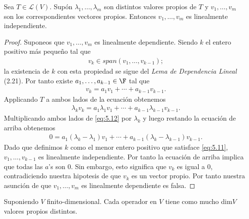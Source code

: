 \documentclass{scrartcl}
\begin{document}
\begin{theorem}
  \label{teo:indep}
  Sea $T \in \mathcal{L}(V)$. Supón $\lambda_1, \ldots ,\lambda_m$ son distintos valores propios de $T$ y $v_1, \ldots , v_m$ son los correspondientes vectores propios. Entonces $v_1, \ldots ,v_m$ es linealmente independiente. 
\end{theorem}

\begin{proof}
Suponeos que $v_1,\ldots ,v_m$ es linealmente dependiente. Siendo $k$ el entero positivo más pequeño tal que
  \begin{align}
  v_k \in span(v_1,\ldots ,v_{k-1}); \tag{5.11} \label{eq:5.11}
  \end{align}
  la existencia de $k$ con esta propiedad se sigue del \emph{Lema de Dependencia Lineal} (2.21). Por tanto existe $a_1,\ldots ,a_{k-1} \in \F$ tal que
  \begin{align}
    v_k = a_1 v_1 + \cdots + a_{k-1}v_{k-1}. \tag{5.12} \label{eq:5.12}
  \end{align}
  Applicando $T$ a ambos lados de la ecuación obtenemos
\begin{align*}
  \lambda_k v_k = a_1 \lambda_1 v_1 + \cdots + a_{k-1}\lambda_{k-1}v_{k-1}.
\end{align*}
Multiplicando ambos lados de \ref{eq:5.12} por $\lambda_k$ y luego restando la ecuación de arriba obtenemos
\begin{align*}
  0 = a_1 (\lambda_k - \lambda_1)v_1 + \cdots + a_{k-1}(\lambda_k - \lambda_{k-1})v_{k-1}.
\end{align*}
Dado que definimos $k$ como el menor entero positivo que satisface \ref{eq:5.11}, $v_1,\ldots ,v_{k-1}$ es linealmente independiente. Por tanto la ecuación de arriba implica que todas las $a$'s son 0. Sin embargo, esto significa que $v_k$ es igual a 0, contradiciendo nuestra hipotesis de que $v_k$ es un vector propio. Por tanto nuestra asunción de que $v_1, \ldots ,v_m$ es linealmente dependiente es falsa.
\end{proof}

\begin{theorem}
Suponiendo $V$ finito-dimensional. Cada operador en $V$ tiene como mucho dim$V$ valores propios distintos.
\end{theorem}
\end{document}
